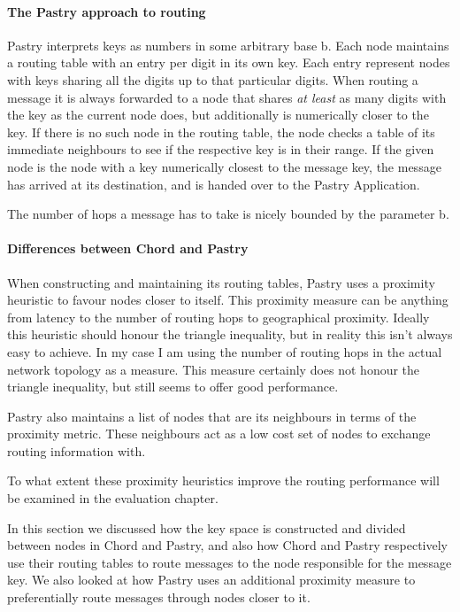 \paragraph{The Pastry approach to routing}
Pastry interprets keys as numbers in some arbitrary base b.
Each node maintains a routing table with an entry per digit in its own key. Each entry represent nodes with keys sharing all the digits up to that particular digits.
When routing a message it is always forwarded to a node that shares \emph{at least} as many digits with the key as the current node does, but additionally is numerically closer to the key. If there is no such node in the routing table, the node checks a table of its immediate neighbours to see if the respective key is in their range. If the given node is the node with a key numerically closest to the message key, the message has arrived at its destination, and is handed over to the Pastry Application.

The number of hops a message has to take is nicely bounded by the parameter b.

\paragraph{Differences between Chord and Pastry}
When constructing and maintaining its routing tables, Pastry uses a proximity heuristic to favour nodes closer to itself. This proximity measure can be anything from latency to the number of routing hops to geographical proximity. Ideally this heuristic should honour the triangle inequality, but in reality this isn't always easy to achieve. In my case I am using the number of routing hops in the actual network topology as a measure. This measure certainly does not honour the triangle inequality, but still seems to offer good performance.

Pastry also maintains a list of nodes that are its neighbours in terms of the proximity metric. These neighbours act as a low cost set of nodes to exchange routing information with.

To what extent these proximity heuristics improve the routing performance will be examined in the evaluation chapter.

\mbox{}

In this section we discussed how the key space is constructed and divided between nodes in Chord and Pastry, and also how Chord and Pastry respectively use their routing tables to route messages to the node responsible for the message key. We also looked at how Pastry uses an additional proximity measure to preferentially route messages through nodes closer to it.

